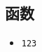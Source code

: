 
\begin{issues}
\issueDraft
\end{issues}

\subsection{函数}
\begin{itemize}
\item \verb|123|
\end{itemize}

